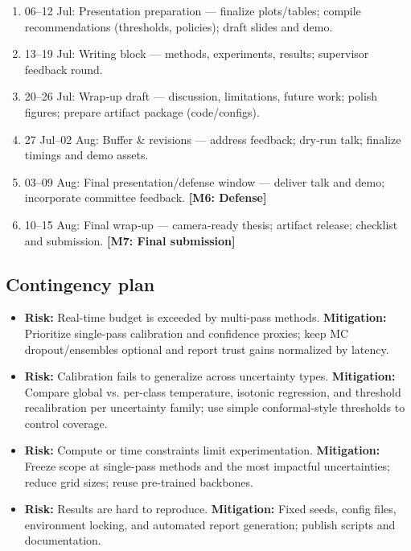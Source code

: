 \documentclass[11pt,a4paper]{article}
\begin{document}
\begin{enumerate}[label=\textbf{W\arabic*}, leftmargin=*]
  \item 06--12 Jul: Presentation preparation — finalize plots/tables; compile recommendations (thresholds, policies); draft slides and demo.
  \item 13--19 Jul: Writing block — methods, experiments, results; supervisor feedback round.
  \item 20--26 Jul: Wrap‑up draft — discussion, limitations, future work; polish figures; prepare artifact package (code/configs).
  \item 27 Jul--02 Aug: Buffer \& revisions — address feedback; dry‑run talk; finalize timings and demo assets.
  \item 03--09 Aug: Final presentation/defense window — deliver talk and demo; incorporate committee feedback. \textbf{[M6: Defense]}
  \item 10--15 Aug: Final wrap‑up — camera‑ready thesis; artifact release; checklist and submission. \textbf{[M7: Final submission]}
\end{enumerate}

\subsection{Contingency plan}

\begin{itemize}
  \item \textbf{Risk:} Real-time budget is exceeded by multi-pass methods. \textbf{Mitigation:} Prioritize single-pass calibration and confidence proxies; keep MC dropout/ensembles optional and report trust gains normalized by latency.
  \item \textbf{Risk:} Calibration fails to generalize across uncertainty types. \textbf{Mitigation:} Compare global vs. per-class temperature, isotonic regression, and threshold recalibration per uncertainty family; use simple conformal-style thresholds to control coverage.
  \item \textbf{Risk:} Compute or time constraints limit experimentation. \textbf{Mitigation:} Freeze scope at single-pass methods and the most impactful uncertainties; reduce grid sizes; reuse pre-trained backbones.
  \item \textbf{Risk:} Results are hard to reproduce. \textbf{Mitigation:} Fixed seeds, config files, environment locking, and automated report generation; publish scripts and documentation.
\end{itemize}
\end{document}

